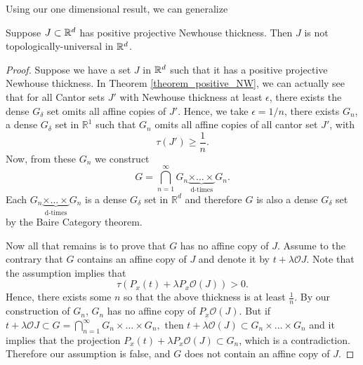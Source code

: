 
Using our one dimensional result, we can generalize 
\begin{theorem}Suppose $J \subset \mathbb{R}^d$ has positive projective Newhouse thickness. Then $J$ is not topologically-universal in $\mathbb{R}^d$.  
\end{theorem}

\begin{proof}  Suppose we have a set $J$ in $\mathbb{R}^d$ such that it has a positive projective Newhouse thickness. In Theorem \ref{theorem_positive_NW}, we can actually see that for all Cantor sets $J'$ with Newhouse thickness at least $\epsilon$, there exists the dense $G_{\delta}$ set  omits all affine copies of $J'$. Hence, we take $\epsilon = 1/n$,  there exists $G_n$, a dense $G_{\delta}$ set in ${\mathbb R}^1$ such that $G_n$ omits all affine copies of all cantor set $J'$, with $$\tau(J') \geq \frac{1}{n}.$$
Now, from these $G_n$ we construct
$$
G = \bigcap_{n=1}^\infty G_n\underbrace{\times \dots \times}_\text{d-times}G_n. 
$$
Each $G_n\underbrace{\times \dots \times}_\text{d-times}G_n $ is a dense $G_\delta$ set in ${\mathbb R}^d$ and therefore $G$ is also a dense $G_\delta$ set by the Baire Category theorem.  

Now all that remains is to prove that $G$ has no affine copy of $J$.   Assume to the contrary that $G$ contains an affine copy of $J$ and denote it by $t+\lambda \mathcal{O}J$. Note that the assumption implies that 
$$
\tau(P_x(t) + \lambda P_x\mathcal{O}(J))> 0.
$$
Hence, there exists some $n$ so that the above thickness is at least $\frac{1}{n}.$ By our construction of $G_n$, $G_n$ has no affine copy of $P_x\mathcal{O}(J)$.  But if $t + \lambda \mathcal{O}J \subset G = \bigcap_{n=1}^\infty G_n \times \dots \times G_n,$ then $t+\lambda \mathcal{O}(J) \subset G_n \times \dots \times G_n$ and it implies that the projection $P_x(t) + \lambda P_x\mathcal{O}(J) \subset G_n$, which is a contradiction.  Therefore our assumption is false, and $G$ does not contain an affine copy of $J$.  
 





\end{proof}